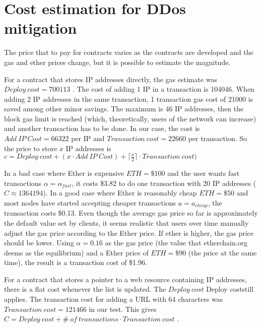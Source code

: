 \section{Cost estimation for DDos mitigation}

The price that to pay for contracts varies as the contracts are developed and the gas and ether prices change, but it is possible to estimate the magnitude.

For a contract that stores IP addresses directly, the gas estimate was $ Deploy\ cost = 700113$ . The cost of adding 1 IP in a transaction is 104046. When adding 2 IP addresses in the same transaction, 1 transaction gas cost of 21000 is saved among other minor savings.  The maximum is 46 IP addresses, then the block gas limit is reached (which, theoretically, users of the network can increase) and another transaction has to be done. In our case, the cost is $ Add \ IP\ Cost = 66322 $ per IP and $ Transaction\ cost = 22660 $ per transaction. So the price to store $ x $ IP addresses is $ c = Deploy\ cost + (x \cdot Add\ IP\ Cost) + \lceil\frac{x}{2}\rceil \cdot Transaction\ cost) $

In a bad case where Ether is expensive $ ETH = \$100 $ and the user wants fast transactions $ \alpha = \alpha_{fast} $, it costs \$3.82 to do one transaction with 20 IP addresses ($ C \approx 1364194 $). In a good case where Ether is reasonably cheap $ ETH = \$50 $ and most nodes have started accepting cheaper transactions $ a = a_{cheap} $, the transaction costs \$0.13. Even though the average gas price so far is approximately the default value set by clients, it seems realistic that users over time manually adjust the gas price according to the Ether price. If ether is higher, the gas price should be lower. Using $ \alpha = 0.16 $ as the gas price (the value that etherchain.org deems as the equilibrium) and a Ether price of $ ETH = \$90 $ (the price at the same time), the result is a transaction cost of \$1.96.

For a contract that stores a pointer to a web resource containing IP addresses, there is a flat cost whenever the list is updated. The $Deploy\ cost$ Deploy coststill applies. The transaction cost for adding a URL with 64 characters was $ Transaction\ cost = 121466 $ in our test. This gives $ C = Deploy\ cost + \#\ of\ transactions \cdot Transaction\ cost$ .
